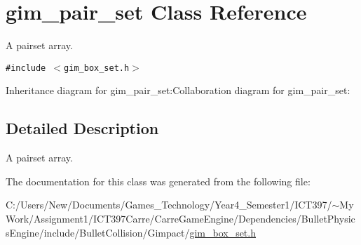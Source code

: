 \hypertarget{classgim__pair__set}{
\section{gim\_\-pair\_\-set Class Reference}
\label{classgim__pair__set}
}
A pairset array.  


{\tt \#include $<$gim\_\-box\_\-set.h$>$}

Inheritance diagram for gim\_\-pair\_\-set:Collaboration diagram for gim\_\-pair\_\-set:

\subsection{Detailed Description}
A pairset array. 

The documentation for this class was generated from the following file:\begin{CompactItemize}
\item 
C:/Users/New/Documents/Games\_\-Technology/Year4\_\-Semester1/ICT397/$\sim$My Work/Assignment1/ICT397Carre/CarreGameEngine/Dependencies/BulletPhysicsEngine/include/BulletCollision/Gimpact/\hyperlink{gim__box__set_8h}{gim\_\-box\_\-set.h}\end{CompactItemize}
